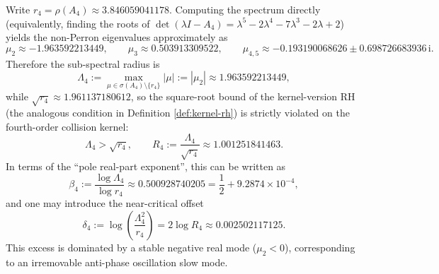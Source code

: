 \begin{remark}\label{rem:pom-collision-rh-break-a4-spectrum}
Write \(r_4=\rho(A_4)\approx 3.846059041178\).
Computing the spectrum directly (equivalently, finding the roots of \(\det(\lambda I-A_4)=\lambda^5-2\lambda^4-7\lambda^3-2\lambda+2\)) yields the non-Perron eigenvalues approximately as
\[
\mu_2\approx -1.963592213449,\qquad
\mu_3\approx 0.503913309522,\qquad
\mu_{4,5}\approx -0.193190068626\pm 0.698726683936\,\mathrm{i}.
\]
Therefore the sub-spectral radius is
\[
\Lambda_4:=\max_{\mu\in\sigma(A_4)\setminus\{r_4\}}|\mu|
:=|\mu_2|
\approx 1.963592213449,
\]
while
\(
\sqrt{r_4}\approx 1.961137180612
\), so the square-root bound of the kernel-version RH (the analogous condition in Definition \ref{def:kernel-rh}) is strictly violated on the fourth-order collision kernel:
\[
\Lambda_4>\sqrt{r_4},\qquad
R_4:=\frac{\Lambda_4}{\sqrt{r_4}}\approx 1.001251841463.
\]
In terms of the ``pole real-part exponent'', this can be written as
\[
\beta_4:=\frac{\log \Lambda_4}{\log r_4}\approx 0.500928740205=\frac12+9.2874\times 10^{-4},
\]
and one may introduce the near-critical offset
\[
\delta_4:=\log\!\left(\frac{\Lambda_4^2}{r_4}\right)=2\log R_4\approx 0.002502117125.
\]
 This excess is dominated by a stable negative real mode (\(\mu_2<0\)), corresponding to an irremovable anti-phase oscillation slow mode.
\end{remark}

